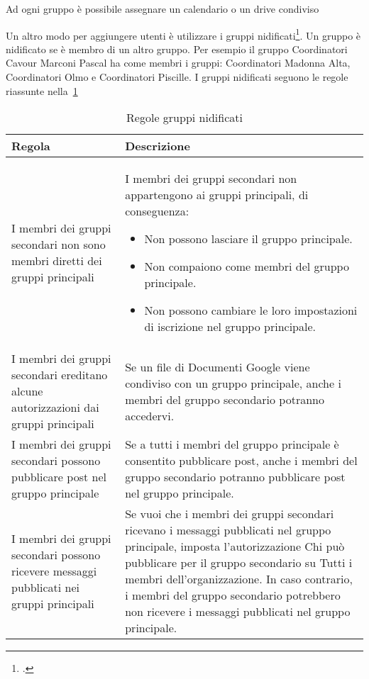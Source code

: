  Ad ogni gruppo è possibile assegnare un calendario o un drive condiviso

Un altro modo per aggiungere utenti è utilizzare i gruppi nidificati\footcite{Google2023a}. Un gruppo è nidificato se è membro di un altro gruppo. Per esempio il gruppo Coordinatori Cavour Marconi Pascal ha come membri i gruppi: Coordinatori Madonna Alta, Coordinatori Olmo e Coordinatori Piscille. I gruppi nidificati seguono le regole riassunte nella~\cref{tab:regGruppiNid}

\begin{table}
	\centering
	\begin{tabularx}{\linewidth}{>{\setlength\hsize{.8\hsize}}X>{\setlength\hsize{\hsize}\setlength\linewidth{\hsize}}X}
\toprule	
Regola&	Descrizione\\
\midrule
I membri dei gruppi secondari non sono membri diretti dei gruppi principali	&
I membri dei gruppi secondari non appartengono ai gruppi principali, di conseguenza:
\begin{itemize}
	\item Non possono lasciare il gruppo principale.
	\item Non compaiono come membri del gruppo principale.
	\item Non possono cambiare le loro impostazioni di iscrizione nel gruppo principale.
\end{itemize}\\
I membri dei gruppi secondari ereditano alcune autorizzazioni dai gruppi principali&
Se un file di Documenti Google viene condiviso con un gruppo principale, anche i membri del gruppo secondario potranno accedervi.\\
I membri dei gruppi secondari possono pubblicare post nel gruppo principale&
Se a tutti i membri del gruppo principale è consentito pubblicare post, anche i membri del gruppo secondario potranno pubblicare post nel gruppo principale.\\
I membri dei gruppi secondari possono ricevere messaggi pubblicati nei gruppi principali&Se vuoi che i membri dei gruppi secondari ricevano i messaggi pubblicati nel gruppo principale, imposta l'autorizzazione Chi può pubblicare per il gruppo secondario su Tutti i membri dell'organizzazione. In caso contrario, i membri del gruppo secondario potrebbero non ricevere i messaggi pubblicati nel gruppo principale.\\
\bottomrule
\end{tabularx}
	\caption{Regole gruppi nidificati}
	\label{tab:regGruppiNid}
\end{table}
